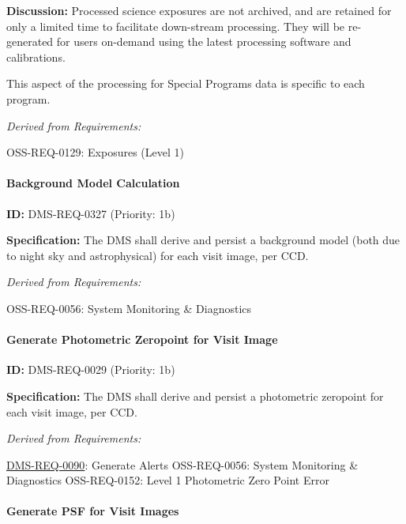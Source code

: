 \documentclass[SE,toc,lsstdraft]{lsstdoc}
\begin{document}
\textbf{Discussion:} Processed science exposures are not archived, and are retained for only a limited time to facilitate down-stream processing. They will be re-generated for users on-demand using the latest processing software and calibrations.

This aspect of the processing for Special Programs data is specific to each program.

\emph{Derived from Requirements:}

OSS-REQ-0129:
Exposures (Level 1) \newline

\paragraph{Background Model Calculation}\hfill  %

\label{DMS-REQ-0327}
\textbf{ID:} DMS-REQ-0327 (Priority: 1b)

\textbf{Specification: }The DMS shall derive and persist a background model (both due to night sky and astrophysical) for each visit image, per CCD.

\emph{Derived from Requirements:}

OSS-REQ-0056:
System Monitoring \& Diagnostics \newline

\paragraph{Generate Photometric Zeropoint for Visit Image}\hfill  %

\label{DMS-REQ-0029}
\textbf{ID:} DMS-REQ-0029 (Priority: 1b)

\textbf{Specification:} The DMS shall derive and persist a photometric zeropoint for each visit image, per CCD.

\emph{Derived from Requirements:}

\hyperref[DMS-REQ-0090]{DMS-REQ-0090}:
Generate Alerts \newline
OSS-REQ-0056:
System Monitoring \& Diagnostics \newline
OSS-REQ-0152:
Level 1 Photometric Zero Point Error \newline

\paragraph{Generate PSF for Visit Images}\hfill  %
\end{document}
